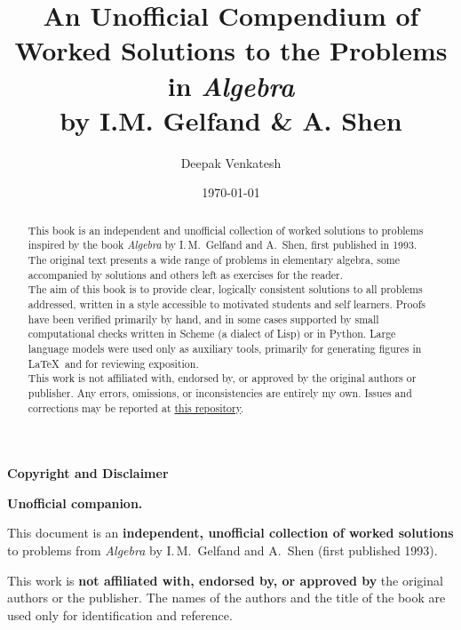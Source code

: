 \documentclass[10pt]{article}
\title {An Unofficial Compendium of Worked Solutions to the Problems in \textit{Algebra}\\
[0.5em]\large by I.M. Gelfand \& A. Shen}
\author{Deepak Venkatesh}
\date{\today}
\newcounter{problem}
\begin{document}
\noindent
\maketitle
\begin{abstract}
\noindent
This book is an independent and unofficial collection of worked solutions
to problems inspired by the book \textit{Algebra} by I.\,M.~Gelfand and A.~Shen,
first published in 1993. The original text presents a wide range of problems
in elementary algebra, some accompanied by solutions and others left as exercises
for the reader.\\

\noindent
The aim of this book is to provide clear, logically consistent solutions
to all problems addressed, written in a style accessible to motivated students
and self learners. Proofs have been verified primarily by hand, and in some cases
supported by small computational checks written in Scheme (a dialect of Lisp) or in Python.
Large language models were used only as auxiliary tools, primarily for generating
figures in \LaTeX\ and for reviewing exposition.\\

\noindent
This work is not affiliated with, endorsed by, or approved by the original authors
or publisher. Any errors, omissions, or inconsistencies are entirely my own.
Issues and corrections may be reported at
\href{https://github.com/deepak-venkatesh/gelfand-shen-algebra/issues}{this repository}.
\end{abstract}

\clearpage
\thispagestyle{empty}

\vspace*{2cm}

\begin{center}
  {\Large \textbf{Copyright and Disclaimer}}
\end{center}

\vspace{1cm}

\noindent
\textbf{Unofficial companion.}

\vspace{0.4cm}

\noindent
This document is an \textbf{independent, unofficial collection of worked solutions}
to problems from \textit{Algebra} by I.\,M.~Gelfand and A.~Shen (first published 1993).

\vspace{0.4cm}

\noindent
This work is \textbf{not affiliated with, endorsed by, or approved by} the original
authors or the publisher. The names of the authors and the title of the book are used
only for identification and reference.
\end{document}

